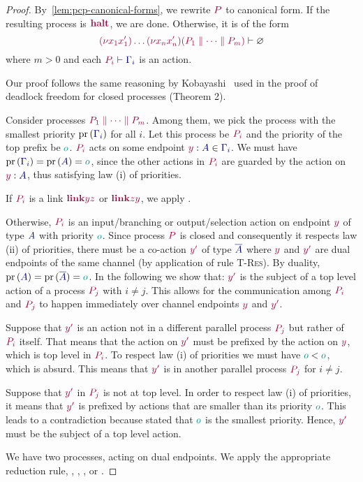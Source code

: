 \begin{proof}
  \label{prf:thm-pcp-closed-progress}
  By~\cref{lem:pcp-canonical-forms}, we rewrite $\tm{P}$ to canonical form. If the resulting process is $\tm{\halt}$, we are done. Otherwise, it is of the form
  \[
    \seq{\res{x_1}{x'_1}{\dots\res{x_n}{x'_n}{(P_1 \parallel\dots\parallel P_m)}}}{\emptyenv}
  \]
  where $m>0$ and each $\seq{P_i}{\ty{\Gamma_i}}$ is an action.

  Our proof follows the same reasoning by Kobayashi~\cite{kobayashi06} used in the proof of deadlock freedom for closed processes (Theorem 2).

  Consider processes $\tm {P_1 \parallel\dots\parallel P_m}$. Among them, we pick the process with the smallest priority $\minpr{(\ty{\Gamma_i})}$ for all $i$. Let this process be $\tm{P_i}$ and the priority of the top prefix be $\cs o$. $\tm{P_i}$ acts on some endpoint $\tmty{y}{A}\in\ty{\Gamma_i}$. We must have $\minpr{(\ty{\Gamma_i})}=\pr{(\ty{A})} = \cs{o}$, since the other actions in $\tm{P_i}$ are guarded by the action on $\tmty{y}{A}$, thus satisfying law (i) of priorities.

  If $\tm{P_i}$ is a link $\tm{\link{y}{z}}$ or $\tm{\link{z}{y}}$, we apply .

  Otherwise, $\tm{P_i}$ is an input/branching or output/selection action on endpoint $\tm{y}$ of type $\ty{A}$ with priority $\cs{o}$. Since process $\tm{P}$ is closed and consequently it respects law (ii) of priorities, there must be a co-action $\tm{y'}$ of type $\ty{\co{A}}$  where $\tm{y}$ and $\tm{y'}$ are dual endpoints of the same channel (by application of rule \textsc{T-Res}). By duality, $\pr{(\ty{A})}=\pr{(\ty{\co{A}})}= \cs{o}$. In the following we show that: $\tm{y'}$ is the subject of a top level action of a process $\tm{P_j}$ with $i\neq j$. This allows for the communication among $\tm{P_i}$ and $\tm{P_j}$ to happen immediately over channel endpoints $\tm{y}$ and $\tm{y'}$.

  Suppose that $\tm{y'}$ is an action not in a different parallel process $\tm{P_j}$ but rather of $\tm{P_i}$ itself. That means that the action on $\tm{y'}$ must be prefixed by the action on $\tm{y}$, which is top level in $\tm{P_i}$. To respect law (i) of priorities we must have $\cs{o}<\cs{o}$, which is absurd. This means that $\tm{y'}$ is in another parallel process $\tm{P_j}$ for $i\neq j$.

  Suppose that $\tm{y'}$ in $\tm{P_j}$ is not at top level. In order to respect law (i) of priorities, it means that $\tm{y'}$ is prefixed by actions that are smaller than its priority $\cs{o}$. This leads to a contradiction because stated that $\cs{o}$ is the smallest priority. Hence, $\tm{y'}$ must be the subject of a top level action.

  We have two processes, acting on dual endpoints. We apply the appropriate reduction rule, \ie {}, , , or .
\end{proof}

